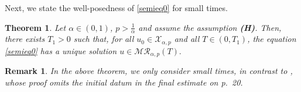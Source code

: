 \documentclass[reqno]{amsart}
\newtheorem{theorem}{Theorem}[section]
\newtheorem{rmk}{Remark}
\numberwithin{equation}{section}
\begin{document}
Next, we state the well-posedness of \eqref{semieq0} for small times.
\begin{theorem}\label{ThmAch}
Let $\alpha\in (0,1)$, $p>\frac{1}{\alpha}$ and assume the assumption \textbf{(H)}. Then, there exists $T_1>0$ such that, for all $u_0\in \mathcal{X}_{\alpha,p}$ and all $T\in (0,T_1)$, the equation \eqref{semieq0} has a unique solution $u\in \mathcal{M}\mathcal{R}_{\alpha,p}(T).$ %
\end{theorem}
\begin{rmk}
In the above theorem, we only consider small times, in contrast to \cite[Theorem~4.2]{Ach22}, whose proof omits the initial datum in the final estimate on p.~20.
\end{rmk}
\end{document}
